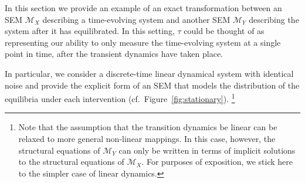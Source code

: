 In this section we provide an example of an exact transformation between an SEM $\mathcal{M}_X$ describing a time-evolving system and another SEM $\mathcal{M}_Y$ describing the system after it has equilibrated. In this setting, $\tau$ could be thought of as representing our ability to only measure the time-evolving system at a single point in time, after the transient dynamics have taken place.

In particular, we consider a discrete-time linear dynamical system with identical noise and provide the explicit form of an SEM that models the distribution of the equilibria under each intervention (cf.\ Figure~\ref{fig:stationary}).%
\footnote{Note that the assumption that the transition dynamics be linear can be relaxed to more general non-linear mappings. In this case, however, the structural equations of $\mathcal{M}_Y$ can only be written in terms of implicit solutions to the structural equations of $\mathcal{M}_X$. For purposes of exposition, we stick here to the simpler case of linear dynamics.}

\medskip

